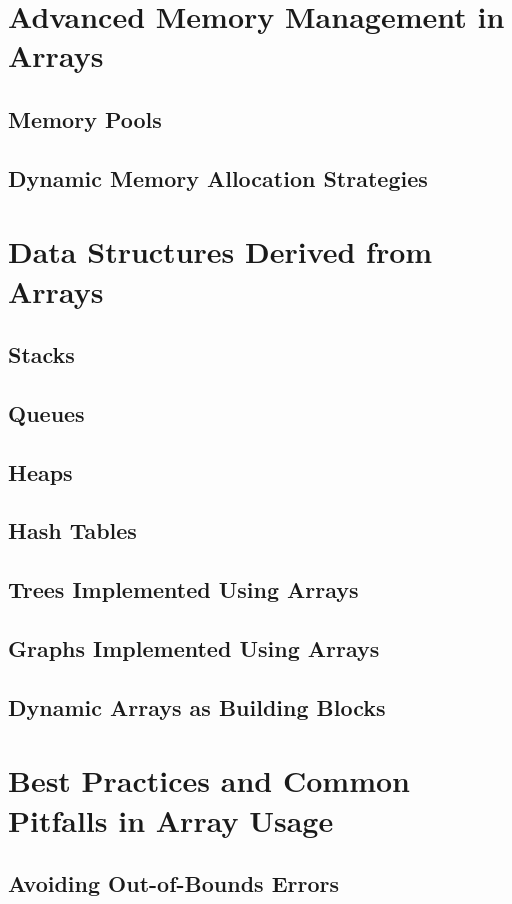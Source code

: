 \documentclass[12pt, oneside]{book}
\begin{document}
	\chapter{Advanced Memory Management in Arrays}
	\section{Memory Pools}
	\section{Dynamic Memory Allocation Strategies}
	
	\chapter{Data Structures Derived from Arrays}
	\section{Stacks}
	\section{Queues}
	\section{Heaps}
	\section{Hash Tables}
	\section{Trees Implemented Using Arrays}
	\section{Graphs Implemented Using Arrays}
	\section{Dynamic Arrays as Building Blocks}
	
	\chapter{Best Practices and Common Pitfalls in Array Usage}
	\section{Avoiding Out-of-Bounds Errors}
\end{document}
